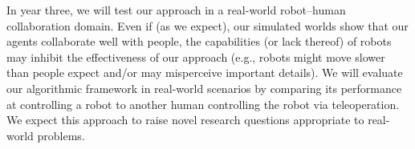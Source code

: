 
In year three, we will test our approach in a real-world robot--human
collaboration domain.  Even if (as we expect), our simulated worlds
show that our agents collaborate well with people, the capabilities
(or lack thereof) of robots may inhibit the effectiveness of our
approach (e.g., robots might move slower than people expect and/or may
misperceive important details).  We will evaluate our algorithmic
framework in real-world scenarios by comparing its performance at
controlling a robot to another human controlling the robot via
teleoperation.  We expect this approach to raise novel research
questions appropriate to real-world problems.

%
% 
% 
%
